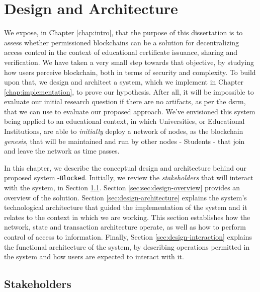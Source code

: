 \chapter{Design and Architecture}
\label{chap:design}

We expose, in Chapter \ref{chap:intro}, that the purpose of this dissertation is to assess whether permissioned blockchains can be a solution for decentralizing access control in the context of educational certificate issuance, sharing and verification. We have taken a very small step towards that objective, by studying how users perceive blockchain, both in terms of security and complexity. To build upon that, we design and architect a system, which we implement in Chapter \ref{chap:implementation}, to prove our hypothesis. After all, it will be impossible to evaluate our initial research question if there are no artifacts, as per the \gls{dsrm}, that we can use to evaluate our proposed approach. We've envisioned this system being applied to an educational context, in which Universities, or Educational Institutions, are able to \textit{initially} deploy a network of nodes, as the blockchain \textit{genesis}, that will be maintained and run by other nodes - Students - that join and leave the network as time passes.

In this chapter, we describe the conceptual design and architecture behind our proposed system -\texttt{Blocked}. Initially, we review the \textit{stakeholders} that will interact with the system, in Section \ref{sec:design-entities}. Section \ref{sec:sec:design-overview} provides an overview of the solution. Section \ref{sec:design-architecture} explains the system's technological architecture that guided the implementation of the system and it relates to the context in which we are working. This section establishes how the network, state and transaction architecture operate, as well as how to perform control of access to information. Finally, Section \ref{sec:design-interaction} explains the functional architecture of the system, by describing operations permitted in the system and how users are expected to interact with it.

\section{Stakeholders}
\label{sec:design-entities}

